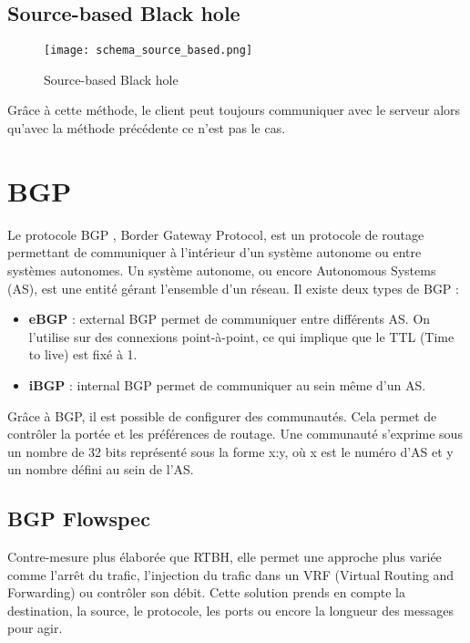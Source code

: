 \subsection{Source-based Black hole}

\begin{figure}[H]
    \texttt{[image: schema\_source\_based.png]}
    \caption{Source-based Black hole}
    \label{fig:source_based}
\end{figure}

Grâce à cette méthode, le client peut toujours communiquer avec le serveur alors qu'avec la méthode précédente ce n'est pas le cas.
\newpage
\section{BGP}
\label{sec:BGP}

Le protocole BGP \cite{Rfcbgp06}, Border Gateway Protocol, est un protocole de routage permettant de communiquer à l'intérieur d'un système autonome ou entre systèmes autonomes. Un système autonome, ou encore Autonomous Systems (AS), est une entité gérant l'ensemble d'un réseau. Il existe deux types de BGP :\newline

\begin{itemize}
    \item \textbf{eBGP} : external BGP permet de communiquer entre différents AS. On l'utilise sur des connexions point-à-point, ce qui implique que le TTL (Time to live) est fixé à 1.\newline
    \item \textbf{iBGP} : internal BGP permet de communiquer au sein même d'un AS. \newline
\end{itemize}

Grâce à BGP, il est possible de configurer des communautés. Cela permet de contrôler la portée et les préférences de routage. Une communauté s'exprime sous un nombre de 32 bits représenté sous la forme x:y, où x est le numéro d'AS et y un nombre défini au sein de l'AS.


\subsection{BGP Flowspec}
Contre-mesure plus élaborée que RTBH, elle permet une approche plus variée comme l'arrêt du trafic, l'injection du trafic dans un VRF (Virtual Routing and Forwarding) ou contrôler son débit. Cette solution prends en compte la destination, la source, le protocole, les ports ou encore la longueur des messages pour agir. \cite{Cis18}
